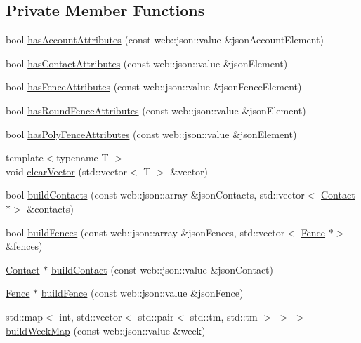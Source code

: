 \subsection*{Private Member Functions}
\begin{DoxyCompactItemize}
\item 
bool \hyperlink{class_account_builder_a6161184b277a8055ccab47411b14d195}{has\+Account\+Attributes} (const web\+::json\+::value \&json\+Account\+Element)
\item 
bool \hyperlink{class_account_builder_a01b1fa1ec8d5eb397a6e61725d67f5a2}{has\+Contact\+Attributes} (const web\+::json\+::value \&json\+Element)
\item 
bool \hyperlink{class_account_builder_a6d19e707adebbf868e26d66f9028a47d}{has\+Fence\+Attributes} (const web\+::json\+::value \&json\+Fence\+Element)
\item 
bool \hyperlink{class_account_builder_aea9045a135dac995cbf409b61c5850bf}{has\+Round\+Fence\+Attributes} (const web\+::json\+::value \&json\+Element)
\item 
bool \hyperlink{class_account_builder_a426cb519ae4c5f0594f0f1e41e9f5a73}{has\+Poly\+Fence\+Attributes} (const web\+::json\+::value \&json\+Element)
\item 
{\footnotesize template$<$typename T $>$ }\\void \hyperlink{class_account_builder_aad3332b566e26b4b92215bf6500b26b6}{clear\+Vector} (std\+::vector$<$ T $>$ \&vector)
\item 
bool \hyperlink{class_account_builder_aa3af3cf2501508d76ee3f7140deeba80}{build\+Contacts} (const web\+::json\+::array \&json\+Contacts, std\+::vector$<$ \hyperlink{class_contact}{Contact} $\ast$$>$ \&contacts)
\item 
bool \hyperlink{class_account_builder_a1992add0c2ab404664d4cbae326c6ec7}{build\+Fences} (const web\+::json\+::array \&json\+Fences, std\+::vector$<$ \hyperlink{class_fence}{Fence} $\ast$$>$ \&fences)
\item 
\hyperlink{class_contact}{Contact} $\ast$ \hyperlink{class_account_builder_a3a3cc8d8beb8af6c0a9feb79e28adb59}{build\+Contact} (const web\+::json\+::value \&json\+Contact)
\item 
\hyperlink{class_fence}{Fence} $\ast$ \hyperlink{class_account_builder_ac5801a1130d7a1f84a66c45cfd6e0a8d}{build\+Fence} (const web\+::json\+::value \&json\+Fence)
\item 
std\+::map$<$ int, std\+::vector$<$ std\+::pair$<$ std\+::tm, std\+::tm $>$ $>$ $>$ \hyperlink{class_account_builder_a19b2e3e2c3bbf986f51c0ec53b7dc2a4}{build\+Week\+Map} (const web\+::json\+::value \&week)

\end{DoxyCompactItemize}
